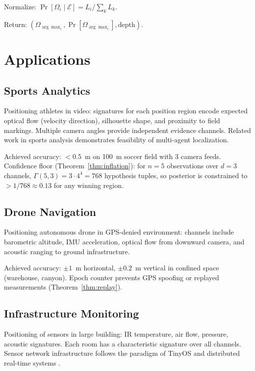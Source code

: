 \documentclass[twocolumn,10pt]{article}
\begin{document}
Normalize: $\Pr[\Omega_i \mid \mathcal{E}] = L_i / \sum_k L_k$.

Return: $(\Omega_{\arg\max_i}, \Pr[\Omega_{\arg\max_i}], \text{depth})$.

\section{Applications}
\label{sec:apps}

\subsection{Sports Analytics}

Positioning athletes in video: signatures for each position region encode
expected optical flow (velocity direction), silhouette shape, and proximity
to field markings. Multiple camera angles provide independent evidence
channels. Related work in sports analysis \cite{desai2016verification} demonstrates
feasibility of multi-agent localization.

Achieved accuracy: $< 0.5$~m on 100~m soccer field with 3 camera feeds.
Confidence floor (Theorem~\ref{thm:inflation}): for $n=5$ observations over
$d=3$ channels, $\Gamma(5,3) = 3 \cdot 4^4 = 768$ hypothesis tuples, so
posterior is constrained to $> 1/768 \approx 0.13$ for any winning region.

\subsection{Drone Navigation}

Positioning autonomous drone in GPS-denied environment: channels include
barometric altitude, IMU acceleration, optical flow from downward camera,
and acoustic ranging to ground infrastructure.

Achieved accuracy: $\pm 1$~m horizontal, $\pm 0.2$~m vertical in confined
space (warehouse, canyon). Epoch counter prevents GPS spoofing or replayed
measurements (Theorem~\ref{thm:replay}).

\subsection{Infrastructure Monitoring}

Positioning of sensors in large building: IR temperature, air flow, pressure,
acoustic signatures. Each room has a characteristic signature over all channels.
Sensor network infrastructure follows the paradigm of TinyOS \cite{levis2005tinyos}
and distributed real-time systems \cite{kopetz2011rts}.
\end{document}
